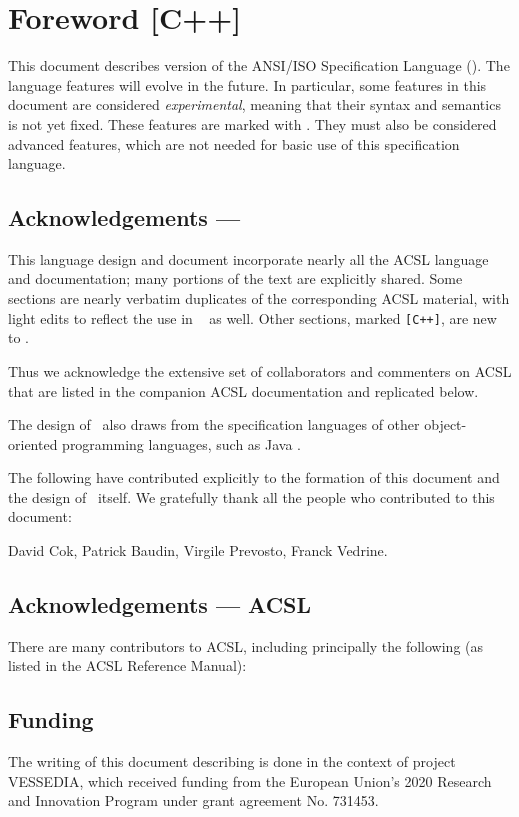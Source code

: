 \chapter*{Foreword [C++]}

This document describes version \acslppversion{}
of the ANSI/ISO \lang Specification Language (\NAME). 
The language features will evolve in the future. 
In particular, some features in this document
are considered \emph{experimental}, meaning that their syntax and
semantics is not yet fixed.  
These features are marked with
\experimental.  
They must also be considered advanced features,
which are not needed for basic use of this
specification language.

\section*{Acknowledgements --- \NAME}

This language design and document incorporate nearly all the 
ACSL language and documentation; many portions of the text
are explicitly shared. 
Some sections are nearly verbatim 
duplicates of the corresponding ACSL material, with light edits
to reflect the use in \NAME~ as well. 
Other sections, marked \texttt{[C++]}, are new to \NAME.

Thus we acknowledge the extensive
set of collaborators and commenters on ACSL that are listed
in the companion ACSL documentation and replicated below.

The design of \NAME~also draws from the specification
languages of other object-oriented programming languages,
such as Java \cite{leavens00jml}.

The following have contributed explicitly to the formation of
this document and the design of \NAME~itself.
We gratefully thank all the people who contributed to this document:

David Cok,
Patrick Baudin,
Virgile Prevosto,
Franck Vedrine.

\section*{Acknowledgements --- ACSL}
There are many contributors to ACSL, including principally the following
(as listed in the ACSL Reference Manual):


\section*{Funding}
The writing of this document describing \NAME is done in the context of
project VESSEDIA,
which  received funding from the European Union's 2020
Research and Innovation Program under grant agreement
No. 731453.
